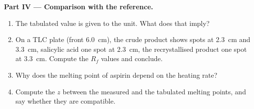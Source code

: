 \begin{problem}
\noindent\textbf{Part IV --- Comparison with the reference.}
\begin{enumerate}[resume]
  \item The tabulated value is given to the unit. What  does that imply?
  \item On a TLC plate (front \qty{6.0}{cm}), the crude product shows
        spots at \qty{2.3}{cm} and \qty{3.3}{cm}, salicylic acid one spot
        at \qty{2.3}{cm}, the recrystallised product one spot at
        \qty{3.3}{cm}. Compute the $R_f$ values and conclude.
  \item Why does the melting point of aspirin depend on the heating rate?
  \item Compute the  $z$ between the measured and the
        tabulated melting points, and say whether they are compatible.
\end{enumerate}
\end{problem}
